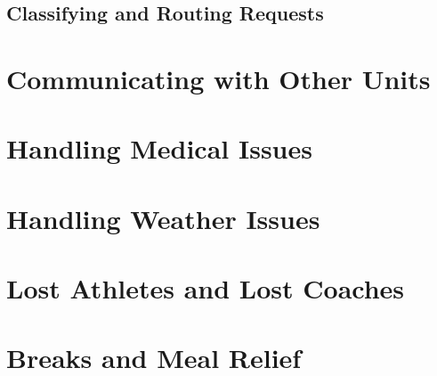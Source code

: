 \documentclass[pdflatex,letterpaper,twoside,12pt]{book}
\begin{document}
\subsection{Classifying and Routing Requests}

\iffalse %
 * Clearly define what types of calls go to Logistics
     o Pieces, parts, 
\fi


\section{Communicating with Other Units}


\section{Handling Medical Issues}


\section{Handling Weather Issues}


\section{Lost Athletes and Lost Coaches}


\section{Breaks and Meal Relief}

\end{document}
